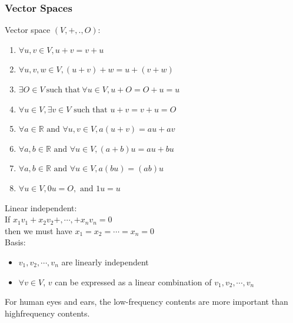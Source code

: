 \subsubsection*{Vector Spaces}
Vector space $(V,+,.,O)$:
\begin{enumerate}
    \item $\forall u,v \in V, u+v=v+u$
    \item $\forall u,v,w \in V, (u+v)+w=u+(v+w)$
    \item $\exists O \in V\ \text{such that}\ \forall u \in V, u+O=O+u=u$
    \item $\forall u \in V,\exists v \in V \text{ such that } u+v=v+u=O$
    \item $\forall a\in\mathbb{R} \text{ and }\forall u,v \in V, a(u+v)=au+av$
    \item $\forall a,b \in\mathbb{R} \text{ and }\forall u\in V,(a+b)u=au+bu$
    \item $\forall a,b \in\mathbb{R} \text{ and }\forall u\in V,a(bu)=(ab)u$
    \item $\forall u\in V,0u=O, \text{ and }1u=u$
\end{enumerate}

Linear independent:\\
If $x_1v_1+x_2v_2+,\cdots,+x_nv_n=0$\\
then we must have $x_1=x_2=\cdots=x_n=0$\\

Basis:
\begin{itemize}
    \item $v_1,v_2,\cdots,v_n$ are linearly independent
    \item $\forall v\in V$, $v$ can be expressed as a linear combination of $v_1, v_2, \cdots, v_n$
\end{itemize}

For human eyes and ears, the low-frequency contents are more important than highfrequency contents.\\
